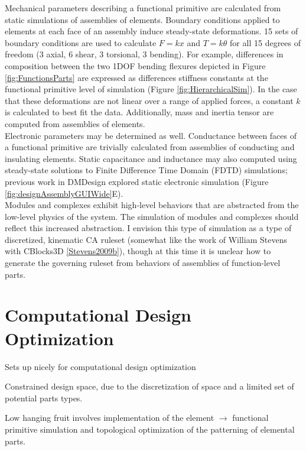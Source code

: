 {Mechanical parameters describing a functional primitive are calculated from static simulations of assemblies of elements.  Boundary conditions applied to elements at each face of an assembly induce steady-state deformations.  15 sets of boundary conditions are used to calculate $F = kx$ and $T = k\theta$ for all 15 degrees of freedom (3 axial, 6 shear, 3 torsional, 3 bending).  For example, differences in composition between the two 1DOF bending flexures depicted in Figure \ref{fig:FunctionsParts} are expressed as differences stiffness constants at the functional primitive level of simulation (Figure \ref{fig:HierarchicalSim}).  In the case that these deformations are not linear over a range of applied forces, a constant $k$ is calculated to best fit the data.  Additionally, mass and inertia tensor are computed from assemblies of elements.\\

Electronic parameters may be determined as well.  Conductance between faces of a functional primitive are trivially calculated from assemblies of conducting and insulating elements.  Static capacitance and inductance may also computed using steady-state solutions to Finite Difference Time Domain (FDTD) simulations; previous work in DMDesign explored static electronic simulation (Figure \ref{fig:designAssemblyGUIWide}E).\\

Modules and complexes exhibit high-level behaviors that are abstracted from the low-level physics of the system.  The simulation of modules and complexes should reflect this increased abstraction.  I envision this type of simulation as a type of discretized, kinematic CA ruleset (somewhat like the work of William Stevens with CBlocks3D \ref{Stevens2009b}), though at this time it is unclear how to generate the governing ruleset from behaviors of assemblies of function-level parts.

\section{Computational Design Optimization}

Sets up nicely for computational design optimization

Constrained design space, due to the discretization of space and a limited set of potential parts types.

Low hanging fruit involves implementation of the element $\rightarrow$ functional primitive simulation and topological optimization of the patterning of elemental parts.


}
